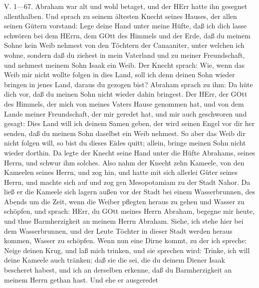 \begin{schriftzitat}
V. 1—67. Abraham war alt und wohl betaget, und der HErr hatte ihn gesegnet allenthalben. Und sprach zu seinem ältesten Knecht seines Hauses, der allen seinen Gütern vorstand: Lege deine Hand unter meine Hüfte, daß ich dich lasse schwören bei dem HErrn, dem GOtt des Himmels und der Erde, daß du meinem Sohne kein Weib nehmest von den Töchtern der Canaaniter, unter welchen ich wohne, sondern daß du ziehest in mein Vaterland und zu meiner Freundschaft, und nehmest meinem Sohn Isaak ein Weib. Der Knecht sprach: Wie, wenn das Weib mir nicht wollte folgen in dies Land, soll ich denn deinen Sohn wieder bringen in jenes Land, daraus du gezogen bist? Abraham sprach zu ihm: Da hüte dich vor, daß du meinen Sohn nicht wieder dahin bringest. Der HErr, der GOtt des Himmels, der mich von meines Vaters Hause genommen hat, und von dem Lande meiner Freundschaft, der mir geredet hat, und mir auch geschworen und gesagt: Dies Land will ich deinem Samen geben, der wird seinen Engel vor dir her senden, daß du meinem Sohn daselbst ein Weib nehmest. So aber das Weib dir nicht folgen will, so bist du dieses Eides quitt; allein, bringe meinen Sohn nicht wieder dorthin. Da legte der Knecht seine Hand unter die Hüfte Abrahams, seines Herrn, und schwur ihm solches. Also nahm der Knecht zehn Kameele, von den Kameelen seines Herrn, und zog hin, und hatte mit sich allerlei Güter seines Herrn, und machte sich auf und zog gen Mesopotamiam zu der Stadt Nahor. Da ließ er die Kameele sich lagern außen vor der Stadt bei einem Wasserbrunnen, des Abends um die Zeit, wenn die Weiber pflegten heraus zu gehen und Wasser zu schöpfen, und sprach: HErr, du GOtt meines Herrn Abraham, begegne mir heute, und thue Barmherzigkeit an meinem Herrn Abraham. Siehe, ich stehe hier bei dem Wasserbrunnen, und der Leute Töchter in dieser Stadt werden heraus kommen, Wasser zu schöpfen. Wenn nun eine Dirne kommt, zu der ich spreche: Neige deinen Krug, und laß mich trinken, und sie sprechen wird: Trinke, ich will deine Kameele auch tränken; daß sie die sei, die du deinem Diener Isaak bescheret habest, und ich an derselben erkenne, daß du Barmherzigkeit an meinem Herrn gethan hast. Und ehe er ausgeredet

\end{schriftzitat}
